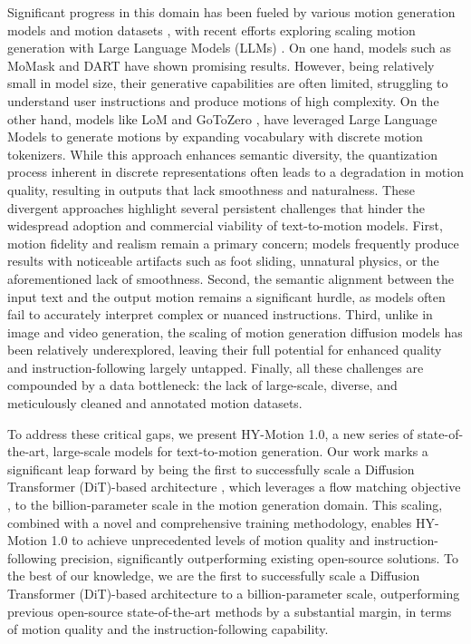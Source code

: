 Significant progress in this domain has been fueled by various motion generation models \cite{mdm,momask,DartControl,motionlcm,remodiffuse,motiondiffuse,mld,Kim2025,Guo_2025_ICCV,Xiao_2025_ICCV,Pinyoanuntapong2025MaskControl} and motion datasets \cite{Guo2022,mahmood2019amass,Mason2022,Li2023,Kim2025,Harvey2020,Kobayashi2023,Guo2025}, with recent efforts exploring scaling motion generation with Large Language Models (LLMs) \cite{t2mgpt,motiongpt_nips,chen2024language,Lu_2025_CVPR,cao2025real,Fan_2025_ICCV}. 
On one hand, models such as MoMask \cite{momask} and DART \cite{DartControl} have shown promising results. However, being relatively small in model size, their generative capabilities are often limited, struggling to understand user instructions and produce motions of high complexity. 
On the other hand, models like LoM \cite{chen2024language} and GoToZero \cite{Fan_2025_ICCV}, have leveraged Large Language Models to generate motions by expanding vocabulary with discrete motion tokenizers. 
While this approach enhances semantic diversity, the quantization process inherent in discrete representations often leads to a degradation in motion quality, resulting in outputs that lack smoothness and naturalness. 
These divergent approaches highlight several persistent challenges that hinder the widespread adoption and commercial viability of text-to-motion models. First, motion fidelity and realism remain a primary concern; models frequently produce results with noticeable artifacts such as foot sliding, unnatural physics, or the aforementioned lack of smoothness. Second, the semantic alignment between the input text and the output motion remains a significant hurdle, as models often fail to accurately interpret complex or nuanced instructions. Third, unlike in image and video generation, the scaling of motion generation diffusion models has been relatively underexplored, leaving their full potential for enhanced quality and instruction-following largely untapped. Finally, all these challenges are compounded by a data bottleneck: the lack of large-scale, diverse, and meticulously cleaned and annotated motion datasets.


To address these critical gaps, we present HY-Motion 1.0, a new series of state-of-the-art, large-scale models for text-to-motion generation. 
Our work marks a significant leap forward by being the first to successfully scale a Diffusion Transformer (DiT)-based architecture \cite{DIT}, which leverages a flow matching objective \cite{Lipman2022,Esser2024,labs2025flux1kontextflowmatching}, to the billion-parameter scale in the motion generation domain. 
This scaling, combined with a novel and comprehensive training methodology, enables HY-Motion 1.0 to achieve unprecedented levels of motion quality and instruction-following precision, significantly outperforming existing open-source solutions.
To the best of our knowledge, we are the first to successfully scale a Diffusion Transformer (DiT)-based architecture \cite{DIT} to a billion-parameter scale, outperforming previous open-source state-of-the-art methods by a substantial margin, in terms of motion quality and the instruction-following capability.

